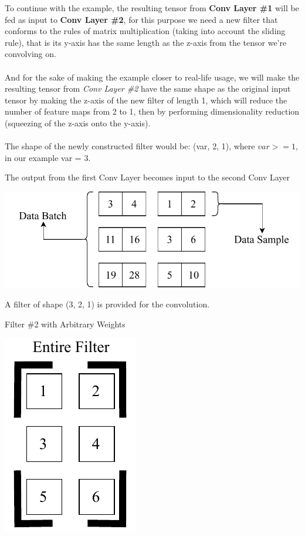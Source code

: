 \documentclass[a4paper, 12pt]{report}
\newcommand\tab[1][1cm]{\hspace*{#1}}
\begin{document}
To continue with the example, the resulting tensor from \textbf{Conv Layer \#1} will be fed as input to \textbf{Conv Layer \#2}, for this purpose we need a new filter that conforms to the rules of matrix multiplication (taking into account the sliding rule), that is its y-axis has the same length as the z-axis from the tensor we're convolving on.\\\\
And for the sake of making the example closer to real-life usage, we will make the resulting tensor from \textit{Conv Layer \#2} have the same shape as the original input tensor by making the z-axis of the new filter of length 1, which will reduce the number of feature maps from 2 to 1, then by performing dimensionality reduction (squeezing of the z-axis onto the y-axis).\\\\
The shape of the newly constructed filter would be: (var, 2, 1), where $ var >= 1 $, in our example var = 3.
\begin{blockfigure}{The output from the first Conv Layer becomes input to the second Conv Layer}
	\begin{center}
		\includegraphics[width=\textwidth]{secondinput_final}
	\end{center}
\end{blockfigure}
\begin{tcbraster}[raster columns=2,raster rows=1,
	enhanced,size=small,fit algorithm=hybrid* ]
	\begin{tcolorbox}[frame hidden,colback=white]
		\tab A filter of shape (3, 2, 1) is provided \tab for the convolution.
	\end{tcolorbox}
	\begin{inlinefigure}{Filter \#2 with Arbitrary Weights}
		\begin{center}
			\includegraphics[height=0.25\textheight]{filter2}
		\end{center}
	\end{inlinefigure}
\end{tcbraster}
\end{document}
